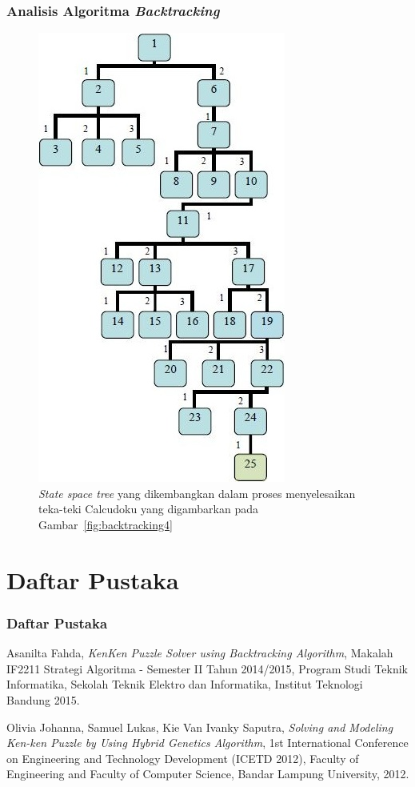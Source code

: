\documentclass{beamer}
\begin{document}
\begin{frame}
\frametitle{Analisis Algoritma \textit{Backtracking}}
\begin{figure}
\centering
\captionsetup{justification=centering}
\includegraphics[scale=0.4]{Gambar/Backtracking8}
\caption[\textit{State space tree} yang dikembangkan dalam proses menyelesaikan teka-teki Calcudoku yang digambarkan pada Gambar~\ref{fig:backtracking4}]{\textit{State space tree} yang dikembangkan dalam proses menyelesaikan teka-teki Calcudoku yang digambarkan pada Gambar~\ref{fig:backtracking4}}
\label{fig:backtracking8}
\end{figure}
\end{frame}

\note{

}

\section{Daftar Pustaka}

\begin{frame}
\frametitle{Daftar Pustaka}
\begin{thebibliography}{9}
  Asanilta Fahda,
  \emph{KenKen Puzzle Solver using Backtracking Algorithm},
  Makalah IF2211 Strategi Algoritma - Semester II Tahun 2014/2015,
  Program Studi Teknik Informatika, Sekolah Teknik Elektro dan Informatika, Institut Teknologi Bandung
  2015.

  Olivia Johanna, Samuel Lukas, Kie Van Ivanky Saputra,
  \emph{Solving and Modeling Ken-ken Puzzle by Using Hybrid Genetics Algorithm},
  1st International Conference on Engineering and Technology Development (ICETD 2012),
  Faculty of Engineering and Faculty of Computer Science, Bandar Lampung University,
  2012.
\end{thebibliography}
\end{frame}

\note{

}
\end{document}
